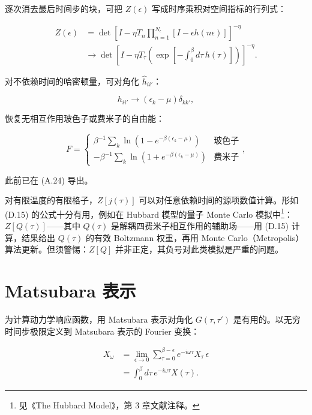 逐次消去最后时间步的块，可把 $Z(\epsilon)$ 写成时序乘积对空间指标的行列式：

\begin{align*}
Z ( \epsilon ) & = \det \left[ I - \eta T_{n} \prod_{n = 1} ^ {N _ {\epsilon}} \left[ I - \epsilon h ( n \epsilon ) \right] \right] ^ {- \eta}\\
& \rightarrow \det \left[ I - \eta T _ {\tau} \left( \exp \left[ - \int_ {0} ^ {\beta} d \tau \, h ( \tau ) \right] \right) \right] ^ {- \eta}.
\tag{D.15}
\end{align*}

对不依赖时间的哈密顿量，可对角化 $\hat{h}_{ii'}$：

\begin{equation*}
h _ {ii '} \rightarrow \left( \epsilon_ {k} - \mu \right) \delta_{kk '} ,
\tag{D.16}
\end{equation*}

恢复无相互作用玻色子或费米子的自由能：

\begin{equation*}
F = \left\{ \begin{array}{ll} \beta^ {- 1} \sum_ {k} \ln \left( 1 - e ^ {- \beta \left( \epsilon_ {k} - \mu \right) } \right) & \text{玻色子} \\ - \beta^ {- 1} \sum_ {k} \ln \left( 1 + e ^ {- \beta \left( \epsilon_ {k} - \mu \right) } \right) & \text{费米子} \end{array} \right. ,
\tag{D.17}
\end{equation*}

此前已在 (A.24) 导出。

对有限温度的有限格子，$Z[j(\tau)]$ 可以对任意依赖时间的源项数值计算。形如 (D.15) 的公式十分有用，例如在 Hubbard 模型的量子 Monte Carlo 模拟中\footnote{见《The Hubbard Model》，第 3 章文献注释。}：$Z[Q(\tau)]$——其中 $Q(\tau)$ 是解耦四费米子相互作用的辅助场——用 (D.15) 计算，结果给出 $Q(\tau)$ 的有效 Boltzmann 权重，再用 Monte Carlo（Metropolis）算法更新。但须警惕：$Z[Q]$ 并非正定，其负号对此类模拟是严重的问题。

\section{Matsubara 表示}

为计算动力学响应函数，用 Matsubara 表示对角化 $G(\tau, \tau')$ 是有用的。以无穷时间步极限定义到 Matsubara 表示的 Fourier 变换：

\begin{align*}
X _ {\omega} & = \lim_{\epsilon \to 0} \sum_{\tau = 0} ^ {\beta - \epsilon} e ^ {- i\omega\tau} X _ {\tau} \, \epsilon\\
& = \int_ {0} ^ {\beta} d \tau \, e ^ {- i\omega\tau} X ( \tau ).
\tag{D.18}
\end{align*}

